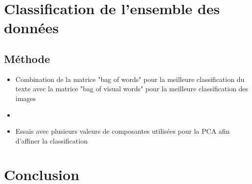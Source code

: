 \documentclass[8pt,aspectratio=169,hyperref={unicode=true}]{beamer}
\begin{document}
\section{Classification de l'ensemble des données}

\subsection{Méthode}
\begin{frame}{\insertsubsection}
\begin{itemize}
    \item Combination de la matrice "bag of words" pour la meilleure classification du texte avec la matrice "bag of visual words" pour la meilleure classification des images
    \item[]
    \item Essais avec plusieurs valeurs de composantes utilisées pour la PCA afin d'affiner la classification
\end{itemize}
\end{frame}

\section{Conclusion}
\end{document}
